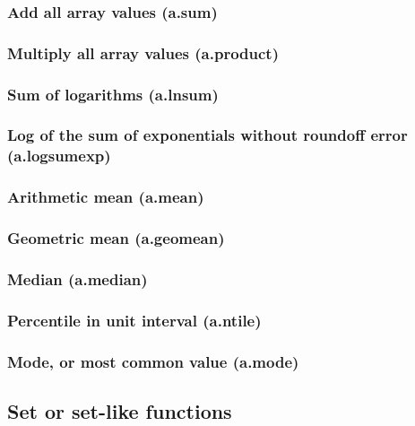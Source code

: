 \documentclass{article}
\theoremstyle{definition}
\begin{document}
\subsubsection{Add all array values (a.sum)}

\subsubsection{Multiply all array values (a.product)}

\subsubsection{Sum of logarithms (a.lnsum)}

\subsubsection{Log of the sum of exponentials without roundoff error (a.logsumexp)}

\subsubsection{Arithmetic mean (a.mean)}

\subsubsection{Geometric mean (a.geomean)}

\subsubsection{Median (a.median)}

\subsubsection{Percentile in unit interval (a.ntile)}

\subsubsection{Mode, or most common value (a.mode)}

\hypertarget{hsec:set-like}{}
\subsection{Set or set-like functions}
\label{sec:set-like}
\end{document}
